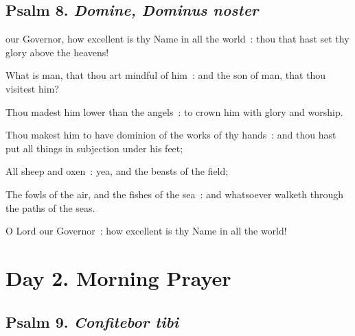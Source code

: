 \subsection{Psalm 8. \textit{Domine, Dominus noster}}


 our Governor, how excellent is thy Name in all the world~: thou that hast set thy glory above the heavens!\par
{}
What is man, that thou art mindful of him~: and the son of man, that thou visitest him?\par
{}Thou madest him lower than the angels~: to crown him with glory and worship.\par
{}Thou makest him to have dominion of the works of thy hands~: and thou hast put all things in subjection under his feet;\par
{}All sheep and oxen~: yea, and the beasts of the field;\par
{}The fowls of the air, and the fishes of the sea~: and whatsoever walketh through the paths of the seas.\par
{}O Lord our Governor~: how excellent is thy Name in all the world!\par

\section*{Day 2. Morning Prayer}

\subsection{Psalm 9. \textit{Confitebor tibi}}


